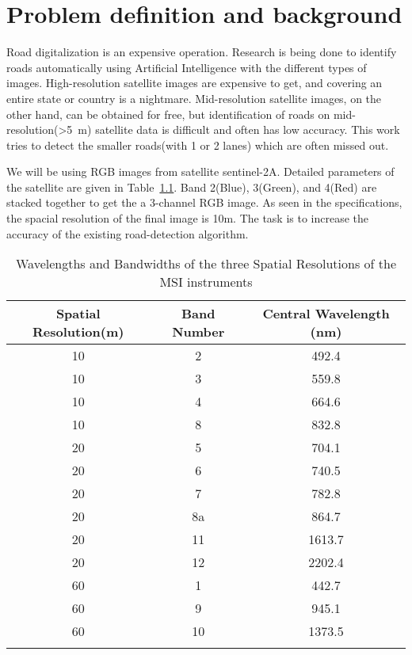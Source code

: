 \chapter{Problem definition and background}\label{chapt:problem}
Road digitalization is an expensive operation. Research is being done to identify roads automatically using Artificial Intelligence with the different types of images. High-resolution satellite images are expensive to get, and covering an entire state or country is a nightmare. Mid-resolution satellite images, on the other hand, can be obtained for free, but identification of roads on mid-resolution(>5~m) satellite data is difficult and often has low accuracy. This work tries to detect the smaller roads(with 1 or 2 lanes) which are often missed out. \par

We will be using RGB images from satellite sentinel-2A. Detailed parameters of the satellite are given in Table~\ref{tab:sentinel-resolution}. Band 2(Blue), 3(Green), and 4(Red) are stacked together to get the a 3-channel RGB image. As seen in the specifications, the spacial resolution of the final image is 10m. The task is to increase the accuracy of the existing road-detection algorithm. \par

\begin{table}[h!]
  \centering
  \begin{tabular}{ |c|c|c| }
    \hline
    Spatial Resolution(m) & Band Number & Central Wavelength (nm) \\
    \hline
    10&2&492.4 \\
    10&3&559.8 \\
    10&4&664.6 \\
    10&8&832.8 \\
    20&5&704.1 \\
    20&6&740.5 \\
    20&7&782.8 \\
    20&8a&864.7 \\
    20&11&1613.7 \\
    20&12&2202.4 \\
    60&1&442.7 \\
    60&9&945.1 \\
    60&10&1373.5 \\
    \hline\\
  \end{tabular}
  \caption{Wavelengths and Bandwidths of the three Spatial Resolutions of the MSI instruments \cite{sentinelSpecifications}}
  \label{tab:sentinel-resolution}
\end{table}

